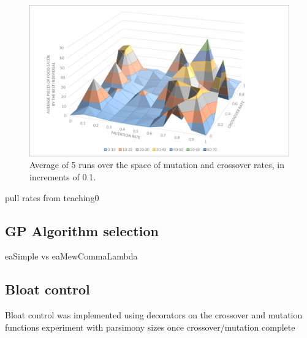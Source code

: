 \documentclass[british,10pt,a4paper]{article}
\begin{document}
\begin{figure}[H]
\centering
	\includegraphics[width=\textwidth,keepaspectratio]{images/cxpb_mutpb.png}
	\caption{Average of 5 runs over the space of mutation and crossover rates, in increments of 0.1.}
	\label{fig:mutpb_cxpb}
\end{figure}
\TODO pull rates from teaching0

\subsection{GP Algorithm selection}
eaSimple vs eaMewCommaLambda
\subsection{Bloat control}
Bloat control was implemented using decorators on the crossover and mutation functions
\TODO experiment with parsimony sizes once crossover/mutation complete
\end{document}
